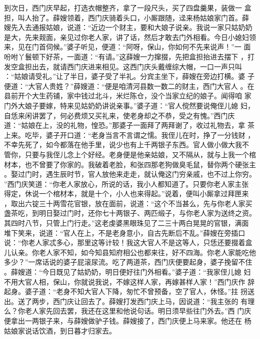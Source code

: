 到次日，西门庆早起，打选衣帽整齐，拿了一段尺头，买了四盘羹果，装做一
盒担，叫人抬了。薛嫂领着，西门庆骑着头口，小厮跟随，迳来杨姑娘家门首。薛
嫂先入去通报姑娘，说道：“近边一个财主，要和大娘子说亲。我说一家只姑奶奶
是大，先来觌面，亲见过你老人家，讲了话，然后才敢去门外相看。今日小媳妇领
来，见在门首伺候。”婆子听见，便道：“阿呀，保山，你如何不先来说声！”一
面吩咐丫鬟顿下好茶，一面道：“有请。”这薛嫂一力撺掇，先把盒担抬进去摆下
，打发空盒担出去，就请西门庆进来相见。这西门庆头戴缠综大帽，一口一声只叫
：“姑娘请受礼。”让了半日，婆子受了半礼。分宾主坐下，薛嫂在旁边打横。婆
子便道：“大官人贵姓？”薛嫂道：“便是咱清河县数一数二的财主，西门大官人
。在县前开个大生药铺，家中钱过北斗，米烂陈仓，没个当家立纪的娘子。闻得咱
家门外大娘子要嫁，特来见姑奶奶讲说亲事。”婆子道：“官人傥然要说俺侄儿媳
妇，自恁来闲讲罢了，何必费烦又买礼来，使老身却之不恭，受之有愧。”西门庆
道：“姑娘在上，没的礼物，惶恐。”那婆子一面拜了两拜谢了，收过礼物去，拿
茶上来。吃毕，婆子开口道：“老身当言不言谓之懦。我侄儿在时，挣了一分钱财
，不幸先死了，如今都落在他手里，说少也有上千两银子东西。官人做小做大我不
管你，只要与我侄儿念上个好经。老身便是他亲姑娘，又不隔从，就与上我一个棺
材本，也不曾要了你家的。我破着老脸，和张四那老狗做臭毛鼠，替你两个硬张主
。娶过门时，遇生辰时节，官人放他来走走，就认俺这门穷亲戚，也不过上你穷。
”西门庆笑道：“你老人家放心，所说的话，我小人都知道了。只要你老人家主张
得定，休说一个棺材本，就是十个，小人也来得起。”说着，便叫小厮拿过拜匣来
，取出六锭三十两雪花官银，放在面前，说道：“这个不当甚么，先与你老人家买
盏茶吃，到明日娶过门时，还你七十两银子、两匹缎子，与你老人家为送终之资。
其四时八节，只管上门行走。”这老虔婆黑眼珠见了二三十两白晃晃的官银，满面
堆下笑来，说道：“官人在上，不是老身意小，自古先断后不乱。”薛嫂在旁插口
说：“你老人家忒多心，那里这等计较！我这大官人不是这等人，只恁还要掇着盒
儿认亲。你老人家不知，如今知县知府相公也都来往，好不四海。你老人家能吃他
多少？”一席话说的婆子屁滚尿流。吃了两道茶，西门庆便要起身，婆子挽留不住
。薛嫂道：“今日既见了姑奶奶，明日便好往门外相看。”婆子道：“我家侄儿媳
妇不用大官人相，保山，你就说我说，不嫁这样人家，再嫁甚样人家！”西门庆作
辞起身。婆子道：“老身不知大官人下降，匆忙不曾预备，空了官人，休怪。”拄
拐送出。送了两步，西门庆让回去了。薛嫂打发西门庆上马，因说道：“我主张的
有理么？你老人家先回去罢，我还在这里和他说句话。明日须早些往门外去。”西
门庆便拿出一两银子来，与薛嫂做驴子钱。薛嫂接了，西门庆便上马来家。他还在
杨姑娘家说话饮酒，到日暮才归家去。

